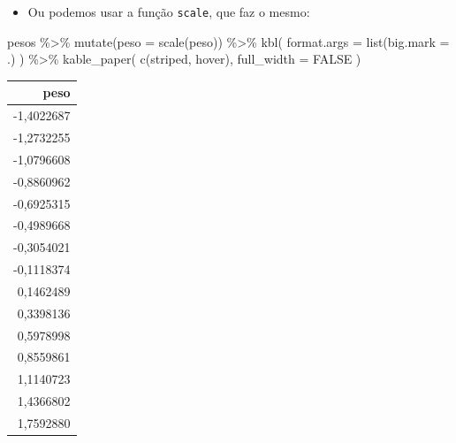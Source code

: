 \documentclass[
  11pt]{report}
\newenvironment{Shaded}{\begin{snugshade}}{\end{snugshade}}
\newcommand{\AttributeTok}[1]{\textcolor[rgb]{0.77,0.63,0.00}{#1}}
\newcommand{\ConstantTok}[1]{\textcolor[rgb]{0.00,0.00,0.00}{#1}}
\newcommand{\FunctionTok}[1]{\textcolor[rgb]{0.00,0.00,0.00}{#1}}
\newcommand{\NormalTok}[1]{#1}
\newcommand{\SpecialCharTok}[1]{\textcolor[rgb]{0.00,0.00,0.00}{#1}}
\newcommand{\StringTok}[1]{\textcolor[rgb]{0.31,0.60,0.02}{#1}}
\providecommand{\tightlist}{%
  \setlength{\itemsep}{0pt}\setlength{\parskip}{0pt}}
\renewenvironment{Shaded}{
    \begin{mdframed}[%
      roundcorner=2pt,%
      innerleftmargin=5pt,%
      innerrightmargin=5pt,%
      topline=true,%
      leftline=true,%
      rightline=true,%
      bottomline=true,%
      linewidth=0.5pt,%
      linecolor=black!20,%
      backgroundcolor=black!2,%
      skipabove=2ex,%
      skipbelow=2.5ex%
    ]%
  }
  {
    \end{mdframed}
  }
\begin{document}
\begin{itemize}
\tightlist
\item
  Ou podemos usar a função \texttt{scale}, que faz o mesmo:
\end{itemize}

\begin{Shaded}
\begin{Highlighting}[]
\NormalTok{pesos }\SpecialCharTok{\%\textgreater{}\%} 
  \FunctionTok{mutate}\NormalTok{(}\AttributeTok{peso =} \FunctionTok{scale}\NormalTok{(peso)) }\SpecialCharTok{\%\textgreater{}\%} 
  \FunctionTok{kbl}\NormalTok{(}
    \AttributeTok{format.args =} \FunctionTok{list}\NormalTok{(}\AttributeTok{big.mark =} \StringTok{\textquotesingle{}.\textquotesingle{}}\NormalTok{)}
\NormalTok{  ) }\SpecialCharTok{\%\textgreater{}\%} 
  \FunctionTok{kable\_paper}\NormalTok{(}
    \FunctionTok{c}\NormalTok{(}\StringTok{\textquotesingle{}striped\textquotesingle{}}\NormalTok{, }\StringTok{\textquotesingle{}hover\textquotesingle{}}\NormalTok{),}
    \AttributeTok{full\_width =} \ConstantTok{FALSE}
\NormalTok{  )}
\end{Highlighting}
\end{Shaded}

\begin{table}
\centering
\begin{tabular}[t]{r}
\hline
peso\\
\hline
-1,4022687\\
\hline
-1,2732255\\
\hline
-1,0796608\\
\hline
-0,8860962\\
\hline
-0,6925315\\
\hline
-0,4989668\\
\hline
-0,3054021\\
\hline
-0,1118374\\
\hline
0,1462489\\
\hline
0,3398136\\
\hline
0,5978998\\
\hline
0,8559861\\
\hline
1,1140723\\
\hline
1,4366802\\
\hline
1,7592880\\
\hline
\end{tabular}
\end{table}
\end{document}
